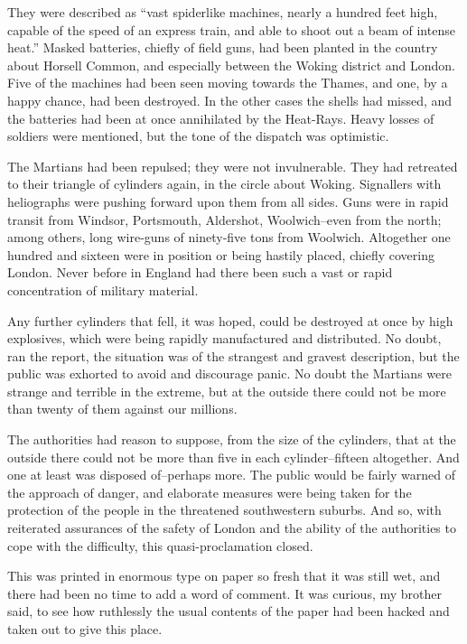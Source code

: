 They were described as ``vast spiderlike machines, nearly a hundred
feet high, capable of the speed of an express train, and able to
shoot out a beam of intense heat.'' Masked batteries, chiefly of
field guns, had been planted in the country about Horsell Common,
and especially between the Woking district and London. Five of the
machines had been seen moving towards the Thames, and one, by a
happy chance, had been destroyed. In the other cases the shells had
missed, and the batteries had been at once annihilated by the
Heat-Rays. Heavy losses of soldiers were mentioned, but the tone of
the dispatch was optimistic.

The Martians had been repulsed; they were not invulnerable. They
had retreated to their triangle of cylinders again, in the circle
about Woking. Signallers with heliographs were pushing forward upon
them from all sides. Guns were in rapid transit from Windsor,
Portsmouth, Aldershot, Woolwich--even from the north; among others,
long wire-guns of ninety-five tons from Woolwich. Altogether one
hundred and sixteen were in position or being hastily placed,
chiefly covering London. Never before in England had there been
such a vast or rapid concentration of military material.

Any further cylinders that fell, it was hoped, could be destroyed
at once by high explosives, which were being rapidly manufactured
and distributed. No doubt, ran the report, the situation was of the
strangest and gravest description, but the public was exhorted to
avoid and discourage panic. No doubt the Martians were strange and
terrible in the extreme, but at the outside there could not be more
than twenty of them against our millions.

The authorities had reason to suppose, from the size of the
cylinders, that at the outside there could not be more than five in
each cylinder--fifteen altogether. And one at least was disposed
of--perhaps more. The public would be fairly warned of the approach
of danger, and elaborate measures were being taken for the
protection of the people in the threatened southwestern suburbs.
And so, with reiterated assurances of the safety of London and the
ability of the authorities to cope with the difficulty, this
quasi-proclamation closed.

This was printed in enormous type on paper so fresh that it was
still wet, and there had been no time to add a word of comment. It
was curious, my brother said, to see how ruthlessly the usual
contents of the paper had been hacked and taken out to give this
place.

